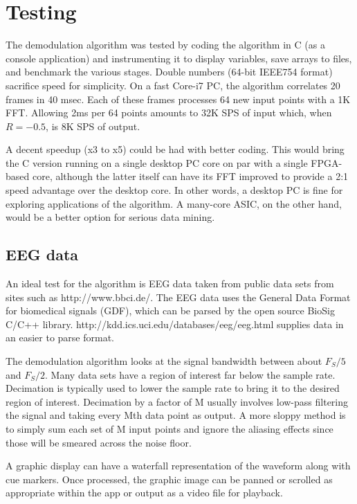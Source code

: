 \section{Testing}

The demodulation algorithm was tested by coding the algorithm in C (as a console
application) and instrumenting it to display variables,
save arrays to files, and benchmark the various stages.
Double numbers (64-bit IEEE754 format) sacrifice speed for simplicity.
On a fast Core-i7 PC, the algorithm correlates 20 frames in 40 msec.
Each of these frames processes 64 new input points with a 1K FFT.
Allowing 2ms per 64 points amounts to 32K SPS of input which, when $R=-0.5$,
is 8K SPS of output.

A decent speedup (x3 to x5) could be had with better coding. 
This would bring the C version running on a single desktop PC core on par with
a single FPGA-based core, although the latter itself can have its FFT improved
to provide a 2:1 speed advantage over the desktop core.
In other words, a desktop PC is fine for exploring applications of the algorithm.
A many-core ASIC, on the other hand, would be a better option for serious data
mining.

\subsection{EEG data}

An ideal test for the algorithm is EEG data taken from public data sets
from sites such as http://www.bbci.de/.
The EEG data uses the General Data Format for biomedical signals (GDF), which
can be parsed by the open source BioSig C/C++ library.
http://kdd.ics.uci.edu/databases/eeg/eeg.html supplies data in an easier to
parse format.

The demodulation algorithm looks at the signal bandwidth between about
$F_S/5$ and $F_S/2$.
Many data sets have a region of interest far below the sample rate.
Decimation is typically used to lower the sample rate to bring it to the
desired region of interest. 
Decimation by a factor of M usually involves low-pass filtering the signal
and taking every Mth data point as output.
A more sloppy method is to simply sum each set of M input points and ignore
the aliasing effects since those will be smeared across the noise floor.

A graphic display can have a waterfall representation of the waveform along
with cue markers. Once processed, the graphic image can be panned or scrolled
as appropriate within the app or output as a video file for playback.


